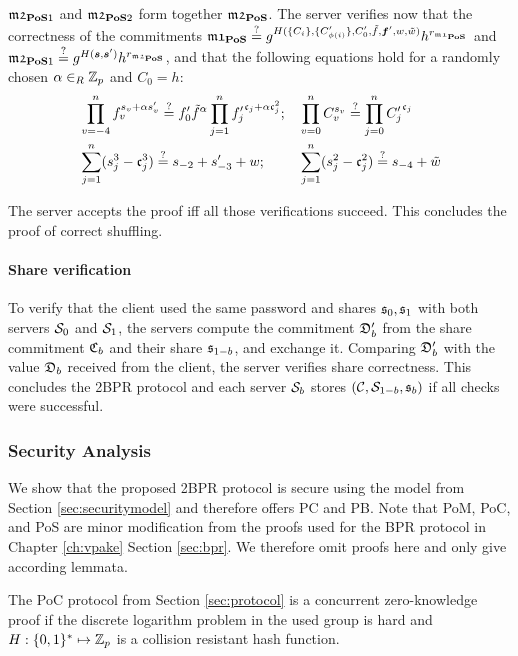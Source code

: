 \noindent
$\mathfrak{m2}_{\mathsf{\bf PoS}1}$ and $\mathfrak{m2}_{\mathsf{\bf PoS}2}$ form together $\mathfrak{m2}_{\mathsf{\bf PoS}}$.
The server verifies now that the correctness of the commitments
$\mathfrak{m1}_\mathsf{\bf PoS} \stackrel{?}{=} g^{H(\{C_i\}, \{C'_{\phi(i)}\}, C'_0, \tilde{f}, \bm f', w, \tilde{w})} h^{r_{\mathfrak{m1}_\mathsf{\bf PoS}}}$ and
$\mathfrak{m2}_{\mathsf{\bf PoS}1} \stackrel{?}{=} g^{H(\bm s, \bm s')} h^{r_{\mathfrak{m2}_\mathsf{\bf PoS}}}$,
and that the following equations hold for a randomly chosen $\alpha\in_R\mathbb{Z}_p$ and $C_0=h$:
\begin{align*}
  & \prod_{v=-4}^{n} f_v^{s_v+\alpha s'_v}  \stackrel{?}{=}  f'_0\tilde{f}^\alpha \prod_{j=1}^n {f'_j}^{\mathfrak{c}_j+\alpha \mathfrak{c}_j^2};
  &&  \prod_{v=0}^n C_v^{s_v}  \stackrel{?}{=}  \prod_{j=0}^n {C'_j}^{\mathfrak{c}_j} \\
  & \sum_{j=1}^n (s_j^3 - \mathfrak{c}_j^3)  \stackrel{?}{=}  s_{-2} + s'_{-3} + w;
  &&  \sum_{j=1}^n (s_j^2 - \mathfrak{c}_j^2)  \stackrel{?}{=}  s_{-4} + \tilde{w} 
\end{align*}

\noindent
The server accepts the proof iff all those verifications succeed.
This concludes the proof of correct shuffling.

\paragraph{Share verification}
To verify that the client used the same password \pwd and shares $\mathfrak{s}_0,\mathfrak{s}_1$ with both servers $\mathcal{S}_0$ and $\mathcal{S}_1$, the servers compute the commitment $\mathfrak{D}'_b$ from the share commitment $\mathfrak{C}_b$ and their share $\mathfrak{s}_{1-b}$, and exchange it.
Comparing $\mathfrak{D}'_b$ with the value $\mathfrak{D}_b$ received from the client, the server verifies share correctness.
This concludes the \ac{2BPR} protocol and each server $\mathcal{S}_b$ stores $(\mathcal{C},\mathcal{S}_{1-b},\mathfrak{s}_b)$ if all checks were successful.

\subsubsection{Security Analysis}
We show that the proposed \ac{2BPR} protocol is secure using the model from Section \ref{sec:securitymodel} and therefore offers \acl{PC} and \acl{PB}.
Note that \ac{PoM}, \ac{PoC}, and \ac{PoS} are minor modification from the proofs used for the \ac{BPR} protocol in Chapter \ref{ch:vpake} Section \ref{sec:bpr}.
We therefore omit proofs here and only give according lemmata.

\begin{lemma}\label{lem:poc2}
  The \ac{PoC} protocol from Section \ref{sec:protocol} is a concurrent zero-knowledge proof if the discrete logarithm problem in the used group \GG is hard and $H:\{0,1\}^\ast\mapsto\mathbb{Z}_p$ is a collision resistant hash function.
\end{lemma}

